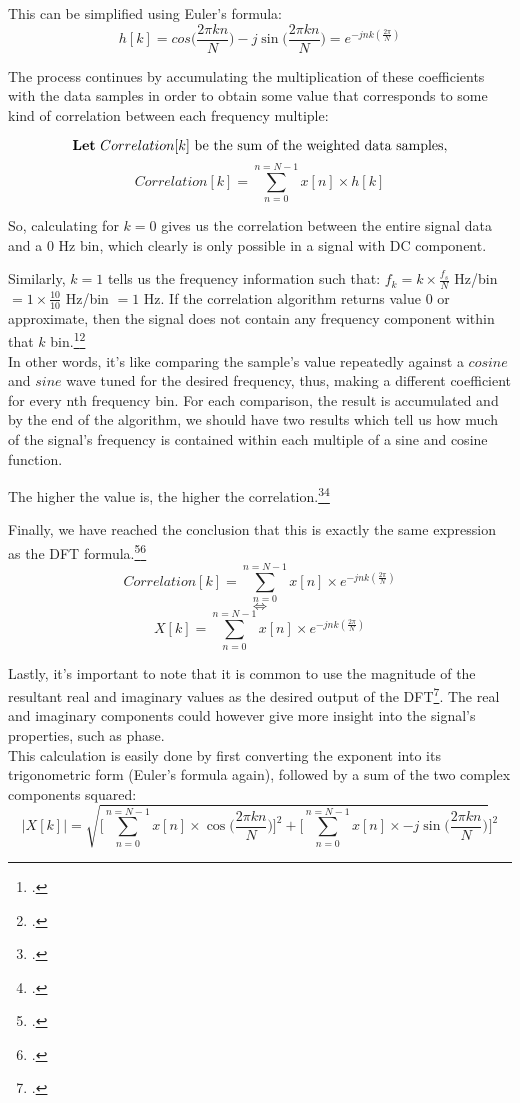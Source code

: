 This can be simplified using Euler's formula:
\[h[k] = cos\Big(\frac{2\pi kn}{N}\Big) - j\sin\Big(\frac{2\pi kn}{N}\Big) = e^{-jnk(\frac{2\pi}{N})}\]

The process continues by accumulating the multiplication of these coefficients with the data samples in order to obtain some value that corresponds to some kind of correlation between each frequency multiple:

\[\text{\textbf{Let} } Correlation[k] \text{ be the sum of the weighted data samples},\] \[Correlation[k] = \sum_{n=0}^{n=N-1} x[n] \times h[k]\]

So, calculating for $k=0$ gives us the correlation between the entire signal data and a 0 Hz bin, which clearly is only possible in a signal with DC component.

Similarly, $k = 1$ tells us the frequency information such that: $f_k = k \times \frac{f_s}{N}$ Hz/bin $ = 1 \times \frac{10}{10}$ Hz/bin $ = 1$ Hz. If the correlation algorithm returns value $0$ or approximate, then the signal does not contain any frequency component within that $k$ bin.\footcite{book1_pp56_60}\footcite{book2_pp53}\\

In other words, it's like comparing the sample's value repeatedly against a $cosine$ and $sine$ wave tuned for the desired frequency, thus, making a different coefficient for every nth frequency bin.
For each comparison, the result is accumulated and by the end of the algorithm, we should have two results which tell us how much of the signal's frequency is contained within each multiple of a sine and cosine function.

\newpage
The higher the value is, the higher the correlation.\footcite{book1_pp62_64}\footcite{book2_pp54_63}

Finally, we have reached the conclusion that this is exactly the same expression as the DFT formula.\footcite{book1_pp56_57}\footcite{book2_pp50}
\[Correlation[k] = \sum_{n=0}^{n=N-1} x[n] \times  e^{-jnk(\frac{2\pi}{N})}\]
\[\Leftrightarrow\]
\[X[k] = \sum_{n=0}^{n=N-1}x[n]\times e^{-jnk(\frac{2\pi}{N})}\]

Lastly, it's important to note that it is common to use the magnitude of the resultant real and imaginary values as the desired output of the DFT\footcite{book1_pp58}. The real and imaginary components could however give more insight into the signal's properties, such as phase.\\

This calculation is easily done by first converting the exponent into its trigonometric form (Euler's formula again), followed by a sum of the two complex components squared:
\[|X[k]| = \sqrt{\Bigg[\sum_{n=0}^{n=N-1}x[n]\times\cos\Big(\frac{2\pi kn}{N}\Big)\Bigg]^2 + \Bigg[\sum_{n=0}^{n=N-1}x[n]\times -j\sin\Big(\frac{2\pi kn}{N}\Big)}\Bigg]^2\]

